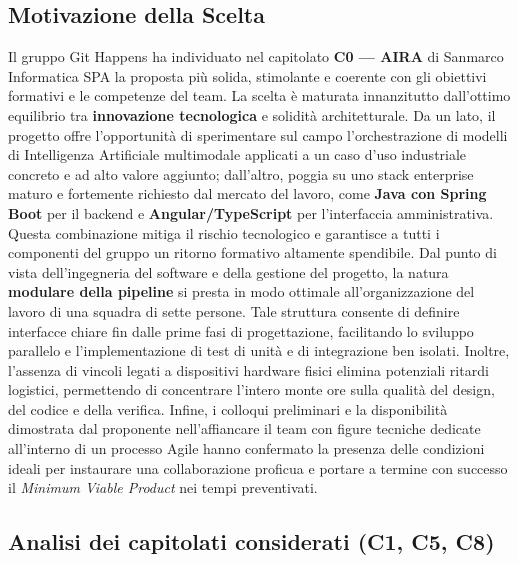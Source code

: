 \subsection*{Motivazione della Scelta}
Il gruppo Git Happens ha individuato nel capitolato\textbf{ C0 — AIRA} di Sanmarco Informatica SPA la proposta più solida, stimolante e coerente con gli obiettivi formativi e le competenze del team.
La scelta è maturata innanzitutto dall'ottimo equilibrio tra \textbf{innovazione tecnologica} e solidità architetturale. Da un lato, il progetto offre l'opportunità di sperimentare sul campo l'orchestrazione di modelli di Intelligenza Artificiale multimodale applicati a un caso d'uso industriale concreto e ad alto valore aggiunto; dall'altro, poggia su uno stack enterprise maturo e fortemente richiesto dal mercato del lavoro, come \textbf{Java con Spring Boot} per il backend e \textbf{Angular/TypeScript} per l'interfaccia amministrativa. Questa combinazione mitiga il rischio tecnologico e garantisce a tutti i componenti del gruppo un ritorno formativo altamente spendibile.
Dal punto di vista dell'ingegneria del software e della gestione del progetto, la natura \textbf{modulare della pipeline} si presta in modo ottimale all'organizzazione del lavoro di una squadra di sette persone. Tale struttura consente di definire interfacce chiare fin dalle prime fasi di progettazione, facilitando lo sviluppo parallelo e l'implementazione di test di unità e di integrazione ben isolati. Inoltre, l'assenza di vincoli legati a dispositivi hardware fisici elimina potenziali ritardi logistici, permettendo di concentrare l'intero monte ore sulla qualità del design, del codice e della verifica.
Infine, i colloqui preliminari e la disponibilità dimostrata dal proponente nell'affiancare il team con figure tecniche dedicate all'interno di un processo Agile hanno confermato la presenza delle condizioni ideali per instaurare una collaborazione proficua e portare a termine con successo il \textit{Minimum Viable Product} nei tempi preventivati.

\subsection{Analisi dei capitolati considerati (C1, C5, C8)}

